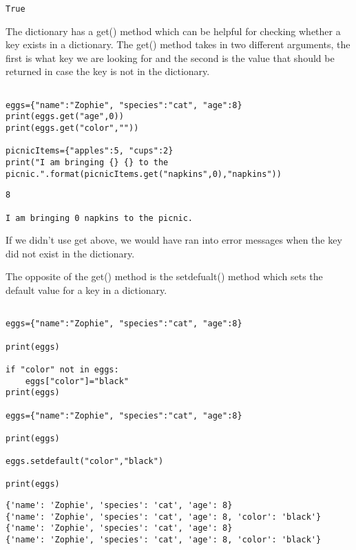 \documentclass[11pt]{article}
\begin{document}
\begin{verbatim}
True
\end{verbatim}



The dictionary has a get() method which can be helpful for checking whether a key exists in a dictionary. The get() method takes in two different arguments, the first is what key we are looking for and the second is the value that should be returned in case the key is not in the dictionary.

\begin{verbatim}

eggs={"name":"Zophie", "species":"cat", "age":8}
print(eggs.get("age",0))
print(eggs.get("color",""))

picnicItems={"apples":5, "cups":2}
print("I am bringing {} {} to the picnic.".format(picnicItems.get("napkins",0),"napkins"))

\end{verbatim}

\begin{verbatim}
8

I am bringing 0 napkins to the picnic.
\end{verbatim}


If we didn't use get above, we would have ran into error messages when the key did not exist in the dictionary.

The opposite of the get() method is the setdefualt() method which sets the default value for a key in a dictionary.

\begin{verbatim}

eggs={"name":"Zophie", "species":"cat", "age":8}

print(eggs)

if "color" not in eggs:
    eggs["color"]="black"
print(eggs)

eggs={"name":"Zophie", "species":"cat", "age":8}

print(eggs)

eggs.setdefault("color","black")

print(eggs)

\end{verbatim}

\begin{verbatim}
{'name': 'Zophie', 'species': 'cat', 'age': 8}
{'name': 'Zophie', 'species': 'cat', 'age': 8, 'color': 'black'}
{'name': 'Zophie', 'species': 'cat', 'age': 8}
{'name': 'Zophie', 'species': 'cat', 'age': 8, 'color': 'black'}
\end{verbatim}
\end{document}
